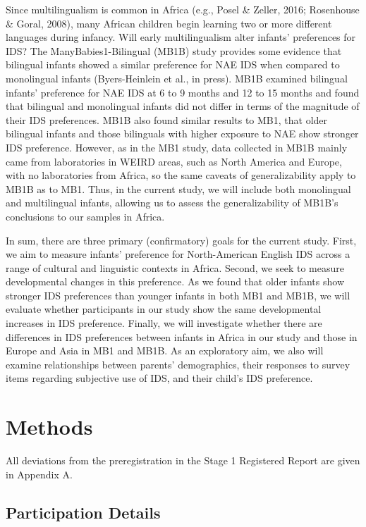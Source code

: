 \documentclass[
  ,man,floatsintext]{apa6}
\begin{document}
Since multilingualism is common in Africa (e.g., Posel \& Zeller, 2016; Rosenhouse \& Goral, 2008), many African children begin learning two or more different languages during infancy. Will early multilingualism alter infants' preferences for IDS? The ManyBabies1-Bilingual (MB1B) study provides some evidence that bilingual infants showed a similar preference for NAE IDS when compared to monolingual infants (Byers-Heinlein et al., in press). MB1B examined bilingual infants' preference for NAE IDS at 6 to 9 months and 12 to 15 months and found that bilingual and monolingual infants did not differ in terms of the magnitude of their IDS preferences. MB1B also found similar results to MB1, that older bilingual infants and those bilinguals with higher exposure to NAE show stronger IDS preference. However, as in the MB1 study, data collected in MB1B mainly came from laboratories in WEIRD areas, such as North America and Europe, with no laboratories from Africa, so the same caveats of generalizability apply to MB1B as to MB1. Thus, in the current study, we will include both monolingual and multilingual infants, allowing us to assess the generalizability of MB1B's conclusions to our samples in Africa.

In sum, there are three primary (confirmatory) goals for the current study. First, we aim to measure infants' preference for North-American English IDS across a range of cultural and linguistic contexts in Africa. Second, we seek to measure developmental changes in this preference. As we found that older infants show stronger IDS preferences than younger infants in both MB1 and MB1B, we will evaluate whether participants in our study show the same developmental increases in IDS preference. Finally, we will investigate whether there are differences in IDS preferences between infants in Africa in our study and those in Europe and Asia in MB1 and MB1B. As an exploratory aim, we also will examine relationships between parents' demographics, their responses to survey items regarding subjective use of IDS, and their child's IDS preference.

\hypertarget{methods}{%
\section{Methods}\label{methods}}

All deviations from the preregistration in the Stage 1 Registered Report are given in Appendix A.

\hypertarget{participation-details}{%
\subsection{Participation Details}\label{participation-details}}
\end{document}
